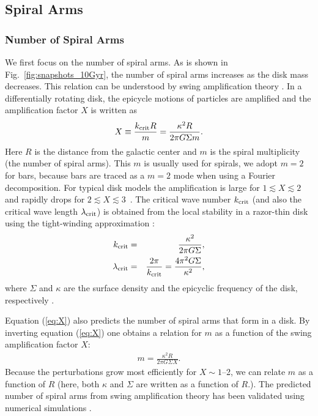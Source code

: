 \subsection{Spiral Arms}
\subsubsection{Number of Spiral Arms}
We first focus on the number of spiral arms. As is shown in 
Fig.~\ref{fig:snapshots_10Gyr}, the number of spiral arms increases 
as the disk mass decreases. This relation can be understood by swing 
amplification theory \citep{1981seng.proc..111T}.
In a differentially rotating disk, the epicycle motions of particles 
are amplified and the amplification factor $X$ is written as 
\begin{eqnarray}
X \equiv \frac{k_{\rm crit}R}{m} = \frac{\kappa^2R}{2\pi G\Sigma m}.
\label{eq:X}
\end{eqnarray}
Here $R$ is the distance from the galactic center and $m$ is
the spiral multiplicity (the number of spiral arms). This $m$ is
  usually used for spirals, we adopt $m=2$ for bars, because bars are
  traced as a $m=2$ mode when using a Fourier decomposition. For
typical disk models the amplification is large for $1\lesssim
X\lesssim 2$ and rapidly drops for $2\lesssim X\lesssim
3$~\citep{1965MNRAS.130..125G,1966ApJ...146..810J,1981seng.proc..111T}.
The critical wave number $k_{\rm crit}$ (and also the critical wave
length $\lambda_{\rm crit}$) is obtained from the local stability in a
razor-thin disk using the tight-winding approximation
\citep{1964ApJ...139.1217T}:
\begin{eqnarray}
k_{\rm crit} &=& \frac{\kappa^2}{2\pi G\Sigma},\\
\lambda_{\rm crit} &=& \frac{2\pi}{k_{\rm crit}} = \frac{4\pi^2G\Sigma}{\kappa^2},
\end{eqnarray} 
where $\Sigma$ and $\kappa$ are the surface density and the epicyclic
frequency of the disk, respectively \citep[see also section 6.2.3 of
][]{2008gady.book.....B}.  

Equation (\ref{eq:X}) also predicts the number of spiral arms that
form in a disk.  By inverting equation (\ref{eq:X}) one obtains a
relation for $m$ as a function of the swing amplification factor
$X$:
\begin{eqnarray}
m =\frac{\kappa^2R}{2\pi G\Sigma X}.
\label{eq:mX}
\end{eqnarray}
Because the perturbations grow most efficiently for $X\sim1$--2, we
can relate $m$ as a function of $R$ (here, both $\kappa$ and $\Sigma$
are written as a function of $R$.). The
predicted number of spiral arms from swing amplification theory
has been validated using numerical simulations
\citep{1985ApJ...298..486C,2015ApJ...808L...8D}.

